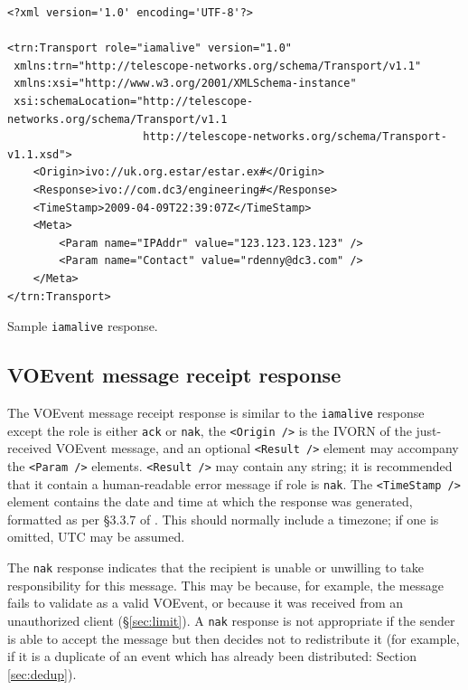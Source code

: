 \documentclass[a4paper,11pt]{ivoa}
\begin{document}
\begin{listing*}
\begin{verbatim}
<?xml version='1.0' encoding='UTF-8'?>

<trn:Transport role="iamalive" version="1.0"
 xmlns:trn="http://telescope-networks.org/schema/Transport/v1.1"
 xmlns:xsi="http://www.w3.org/2001/XMLSchema-instance"
 xsi:schemaLocation="http://telescope-networks.org/schema/Transport/v1.1
                     http://telescope-networks.org/schema/Transport-v1.1.xsd">
    <Origin>ivo://uk.org.estar/estar.ex#</Origin>
    <Response>ivo://com.dc3/engineering#</Response>
    <TimeStamp>2009-04-09T22:39:07Z</TimeStamp>
    <Meta>
        <Param name="IPAddr" value="123.123.123.123" />
        <Param name="Contact" value="rdenny@dc3.com" />
    </Meta>
</trn:Transport>
\end{verbatim}
\caption{Sample \texttt{iamalive} response.}
\label{lst:iamaliveresponse}
\end{listing*}

\subsection{VOEvent message receipt response}
\label{sec:transport:ack}

The VOEvent message receipt response is similar to the \texttt{iamalive}
response except the role is either \texttt{ack} or \texttt{nak}, the
\texttt{<Origin~/>} is the IVORN of the just-received VOEvent message, and an
optional \texttt{<Result~/>} element may accompany the \texttt{<Param~/>}
elements. \texttt{<Result~/>} may contain any string; it is recommended that
it contain a human-readable error message if role is \texttt{nak}. The
\texttt{<TimeStamp~/>} element contains the date and time at which the
response was generated, formatted as per \S3.3.7 of \citet{Peterson:2012}.
This should normally include a timezone; if one is omitted, UTC may be
assumed.

The \texttt{nak} response indicates that the recipient is unable or unwilling
to take responsibility for this message. This may be because, for example, the
message fails to validate as a valid VOEvent, or because it was received from
an unauthorized client (\S\ref{sec:limit}). A \texttt{nak} response is not
appropriate if the sender is able to accept the message but then decides not
to redistribute it (for example, if it is a duplicate of an event which has
already been distributed: Section \ref{sec:dedup}).
\end{document}
